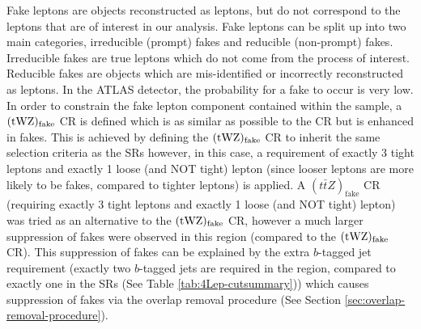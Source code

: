 Fake leptons are objects reconstructed as leptons, but do not correspond to the leptons that are of interest in our analysis. Fake leptons can be split up into two main categories, irreducible (prompt) fakes and reducible (non-prompt) fakes. Irreducible fakes are true leptons which do not come from the process of interest. Reducible fakes are objects which are mis-identified or incorrectly reconstructed as leptons. In the ATLAS detector, the probability for a fake to occur is very low. In order to constrain the fake lepton component contained within the \ttZ sample, a $(\tWZ)_{\text{fake}}$ CR is defined which is as similar as possible to the \tWZ CR but is enhanced in fakes. This is achieved by defining the $(\tWZ)_{\text{fake}}$ CR to inherit the same selection criteria as the \tWZ SRs however, in this case, a requirement of exactly 3 tight leptons and exactly 1 loose (and NOT tight) lepton (since looser leptons are more likely to be fakes, compared to tighter leptons) is applied. A $(t\bar{t}Z)_{\text{fake}}$ CR (requiring exactly 3 tight leptons and exactly 1 loose (and NOT tight) lepton) was tried as an alternative to the $(\tWZ)_{\text{fake}}$ CR, however a much larger suppression of fakes were observed in this region (compared to the $(\tWZ)_{\text{fake}}$ CR). This suppression of fakes can be explained by the extra $b$-tagged jet requirement (exactly two $b$-tagged jets are required in the \ttZ region, compared to exactly one in the \tWZ SRs (See Table \ref{tab:4Lep-cutsummary})) which causes suppression of fakes via the overlap removal procedure (See Section \ref{sec:overlap-removal-procedure}).\\

